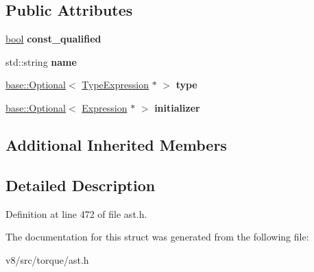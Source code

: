 \subsection*{Public Attributes}
\begin{DoxyCompactItemize}
\item 
\mbox{\label{structv8_1_1internal_1_1torque_1_1VarDeclarationStatement_aa9cd580708d5626658e5f8fdb6320903}} 
\mbox{\hyperlink{classbool}{bool}} {\bfseries const\+\_\+qualified}
\item 
\mbox{\label{structv8_1_1internal_1_1torque_1_1VarDeclarationStatement_a59d7f22426e40d802c1881610a508939}} 
std\+::string {\bfseries name}
\item 
\mbox{\label{structv8_1_1internal_1_1torque_1_1VarDeclarationStatement_a823d3581ff0162bd3633045f588866f1}} 
\mbox{\hyperlink{classv8_1_1base_1_1Optional}{base\+::\+Optional}}$<$ \mbox{\hyperlink{structv8_1_1internal_1_1torque_1_1TypeExpression}{Type\+Expression}} $\ast$ $>$ {\bfseries type}
\item 
\mbox{\label{structv8_1_1internal_1_1torque_1_1VarDeclarationStatement_ac9799109984f8bbf7834a1434ce9831f}} 
\mbox{\hyperlink{classv8_1_1base_1_1Optional}{base\+::\+Optional}}$<$ \mbox{\hyperlink{structv8_1_1internal_1_1torque_1_1Expression}{Expression}} $\ast$ $>$ {\bfseries initializer}
\end{DoxyCompactItemize}
\subsection*{Additional Inherited Members}


\subsection{Detailed Description}


Definition at line 472 of file ast.\+h.



The documentation for this struct was generated from the following file\+:\begin{DoxyCompactItemize}
\item 
v8/src/torque/ast.\+h\end{DoxyCompactItemize}
